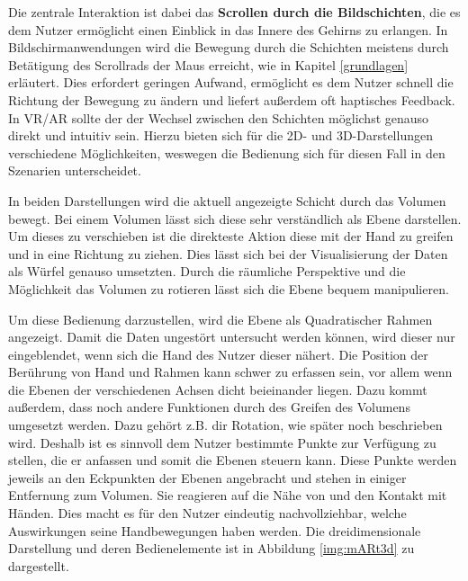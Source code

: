 Die zentrale Interaktion ist dabei das \textbf{Scrollen durch die Bildschichten}, die es dem Nutzer ermöglicht einen Einblick in das Innere des Gehirns zu erlangen. In Bildschirmanwendungen wird die Bewegung durch die Schichten meistens durch Betätigung des Scrollrads der Maus erreicht, wie in Kapitel \ref{grundlagen} erläutert.
Dies erfordert geringen Aufwand, ermöglicht es dem Nutzer schnell die Richtung der Bewegung zu ändern und liefert außerdem oft haptisches Feedback. 
In VR/AR sollte der der Wechsel zwischen den Schichten möglichst genauso direkt und intuitiv sein. 
Hierzu bieten sich für die 2D- und 3D-Darstellungen verschiedene Möglichkeiten, weswegen die Bedienung sich für diesen Fall in den Szenarien unterscheidet. 

In beiden Darstellungen wird die aktuell angezeigte Schicht durch das Volumen bewegt. Bei einem Volumen lässt sich diese sehr verständlich als Ebene darstellen. Um dieses zu verschieben ist die direkteste Aktion diese mit der Hand zu greifen und in eine Richtung zu ziehen. 
Dies lässt sich bei der Visualisierung der Daten als Würfel genauso umsetzten. Durch die räumliche Perspektive und die Möglichkeit das Volumen zu rotieren lässt sich die Ebene bequem manipulieren. 

Um diese Bedienung darzustellen, wird die Ebene als Quadratischer Rahmen angezeigt. Damit die Daten ungestört untersucht werden können, wird dieser nur eingeblendet, wenn sich die Hand des Nutzer dieser nähert. 
Die Position der Berührung von Hand und Rahmen kann schwer zu erfassen sein, vor allem wenn die Ebenen der verschiedenen Achsen dicht beieinander liegen. Dazu kommt außerdem, dass noch andere Funktionen durch des Greifen des Volumens umgesetzt werden. Dazu gehört z.B. dir Rotation, wie später noch beschrieben wird. Deshalb ist es sinnvoll dem Nutzer bestimmte Punkte zur Verfügung zu stellen, die er anfassen und somit die Ebenen steuern kann. Diese Punkte werden jeweils an den Eckpunkten der Ebenen angebracht und stehen in einiger Entfernung zum Volumen. Sie reagieren auf die Nähe von und den Kontakt mit Händen. Dies macht es für den Nutzer eindeutig nachvollziehbar, welche Auswirkungen seine Handbewegungen haben werden. 
Die dreidimensionale Darstellung und deren Bedienelemente ist in Abbildung \ref{img:mARt3d} zu dargestellt.

